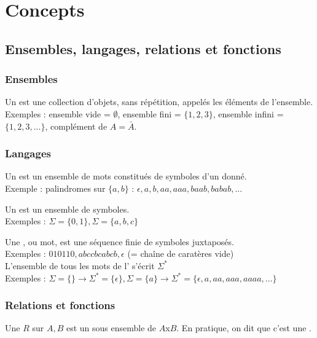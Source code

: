 \chapter{Concepts}

\section{Ensembles, langages, relations et fonctions}

\subsection{Ensembles}

Un  est une collection d'objets, sans répétition, appelés les éléments de l'ensemble.\\
Exemples : ensemble vide = $\emptyset$, ensemble fini = $\{1, 2, 3\}$, ensemble infini = $\{1, 2, 3, ...\}$, complément de $A = \bar{A}$.

\subsection{Langages}

Un  est un ensemble de mots constitués de symboles d'un  donné.\\
Exemple : palindromes sur $\{a, b\}$ : $\epsilon, a, b, aa, aaa, baab, babab, ...$

Un  est un ensemble de symboles.\\
Exemples : $\Sigma = \{0, 1\}, \Sigma = \{a, b, c\}$

Une , ou mot, est une séquence finie de symboles juxtaposés.\\
Exemples : $010110, abccbcabcb, \epsilon$ (= chaîne de caratères vide)\\
L'ensemble de tous les mots de l' s'écrit $\Sigma^*$\\
Exemples : $\Sigma = \{\} \rightarrow \Sigma^* = \{\epsilon\}, \Sigma = \{a\} \rightarrow \Sigma^* = \{\epsilon, a, aa, aaa, aaaa, ...\}$

\subsection{Relations et fonctions}

Une  $R$ sur $A, B$ est un sous ensemble de $A$x$B$. En pratique, on dit que c'est une .

